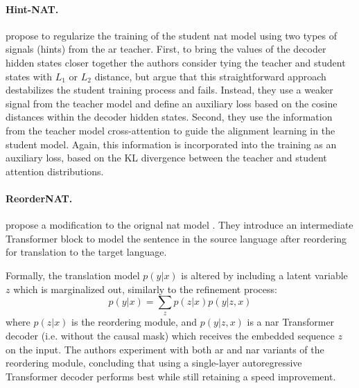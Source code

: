 \paragraph{Hint-NAT.} \citet{li-etal-2019-hint} propose to regularize the
training of the student \ac{nat} model using two types of signals (hints) from
the \ac{ar} teacher. First, to bring the values of the decoder hidden states
closer together the authors consider tying the teacher and student states with
$L_1$ or $L_2$ distance, but argue that this straightforward approach
destabilizes the student training process and fails. Instead, they use a weaker
signal from the teacher model and define an auxiliary loss based on the cosine
distances within the decoder hidden states. Second, they use the information
from the teacher model cross-attention to guide the alignment learning in the
student model. Again, this information is incorporated into the training as an
auxiliary loss, based on the KL divergence between the teacher and student
attention distributions.

 



\paragraph{ReorderNAT.} \citet{ran-etal-2021-guiding} propose a modification to
the orignal \ac{nat} model \citep{gu2017nonautoregressive}. They introduce an
intermediate Transformer block to model the sentence in the source language
after reordering for translation to the target language.

Formally, the translation model $p(y|x)$ is altered by including a latent
variable $z$ which is marginalized out, similarly to the refinement process:
%
\begin{equation}
  p(y|x) = \sum_{z} p(z|x) p(y|z,x)
\end{equation}
%
where $p(z|x)$ is the reordering module, and $p(y|z,x)$ is a \ac{nar}
Transformer decoder (i.e. without the causal mask) which receives the embedded
sequence $z$ on the input. The authors experiment with both \ac{ar} and
\ac{nar} variants of the reordering module, concluding that using a
single-layer autoregressive Transformer decoder performs best while still
retaining a speed improvement.

